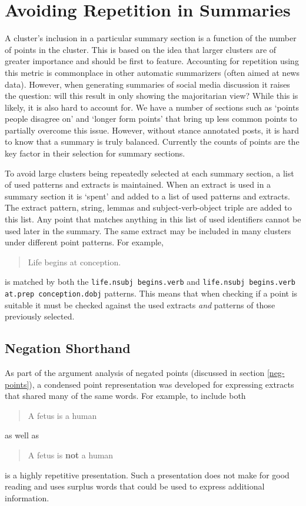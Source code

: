   \section{Avoiding Repetition in Summaries}
    A cluster's inclusion in a particular summary section is a function of the number of points in the cluster. This is based on the idea that larger clusters are of greater importance and should be first to feature. Accounting for repetition using this metric is commonplace in other automatic summarizers (often aimed at news data). However, when generating summaries of social media discussion it raises the question: will this result in only showing the majoritarian view? While this is likely, it is also hard to account for. We have a number of sections such as `points people disagree on' and `longer form points' that bring up less common points to partially overcome this issue. However, without stance annotated posts, it is hard to know that a summary is truly balanced. Currently the counts of points are the key factor in their selection for summary sections.

    To avoid large clusters being repeatedly selected at each summary section, a list of used patterns and extracts is maintained. When an extract is used in a summary section it is `spent' and added to a list of used patterns and extracts. The extract pattern, string, lemmas and subject-verb-object triple are added to this list. Any point that matches anything in this list of used identifiers cannot be used later in the summary. The same extract may be included in many clusters under different point patterns. For example, \blockquote{Life begins at conception.} is matched by both the \texttt{life.nsubj begins.verb} and \texttt{life.nsubj begins.verb at.prep conception.dobj} patterns. This means that when checking if a point is suitable it must be checked against the used extracts \textit{and} patterns of those previously selected.

    \tocless\subsection{Negation Shorthand}
      As part of the argument analysis of negated points (discussed in section \ref{neg-points}), a condensed point representation was developed for expressing extracts that shared many of the same words. For example, to include both \blockquote{A fetus is a human} as well as \blockquote{A fetus is \textbf{not} a human} is a highly repetitive presentation. Such a presentation does not make for good reading and uses surplus words that could be used to express additional information.

